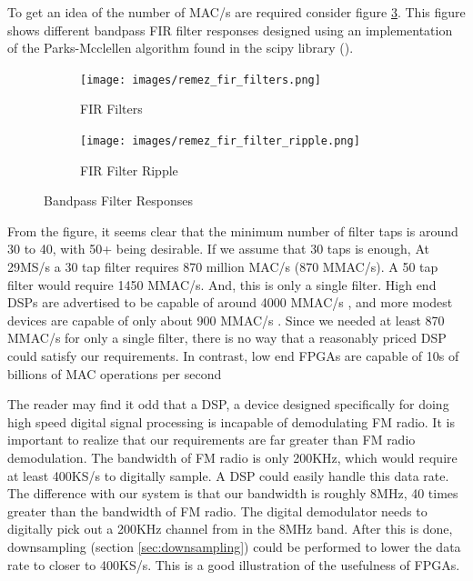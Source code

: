 \documentclass[a4paper, 12pt, notitlepage]{article}
\begin{document}
To get an idea of the number of MAC/s are required consider figure \ref{fig:remez_filters}.  This figure shows different bandpass FIR filter responses designed using an implementation of the Parks-Mcclellen algorithm found in the scipy library (\cite{scipy-remez}).

\begin{figure}[ht]
\centering
\begin{subfigure}[b]{0.45\textwidth}
  \texttt{[image: images/remez\_fir\_filters.png]}
  \caption{FIR Filters}
  \label{fig:fir_filters_response}
\end{subfigure}
\begin{subfigure}[b]{0.45\textwidth}
  \texttt{[image: images/remez\_fir\_filter\_ripple.png]}
  \caption{FIR Filter Ripple}
  \label{fig:fir_filters_ripple}
\end{subfigure}

\caption{Bandpass Filter Responses}
\label{fig:remez_filters}
\end{figure}

From the figure, it seems clear that the minimum number of filter taps is around 30 to 40, with 50+ being desirable.  If we assume that 30 taps is enough,  At 29MS/s a 30 tap filter requires 870 million MAC/s (870 MMAC/s).  A 50 tap filter would require 1450 MMAC/s.  And, this is only a single filter.  High end DSPs are advertised to be capable of around 4000 MMAC/s \cite{tigersharc_mac_performance}, and more modest devices are capable of only about 900 MMAC/s \cite{sharc_mac_performance}.  Since we needed at least 870 MMAC/s for only a single filter, there is no way that a reasonably priced DSP could satisfy our requirements.  In contrast, low end FPGAs are capable of 10s of billions of MAC operations per second \cite{xilinx_mac_performance}

The reader may find it odd that a DSP, a device designed specifically for doing high speed digital signal processing is incapable of demodulating FM radio.  It is important to realize that our requirements are far greater than FM radio demodulation.  The bandwidth of FM radio is only 200KHz, which would require at least 400KS/s to digitally sample.  A DSP could easily handle this data rate.  The difference with our system is that our bandwidth is roughly 8MHz, 40 times greater than the bandwidth of FM radio.  The digital demodulator needs to digitally pick out a 200KHz channel from in the 8MHz band.  After this is done, downsampling (section \ref{sec:downsampling}) could be performed to lower the data rate to closer to 400KS/s.  This is a good illustration of the usefulness of FPGAs.
\end{document}
